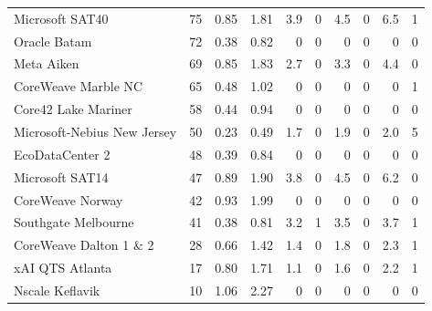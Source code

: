{\begin{longtable}{@{}lrrrrrrrrr@{}}
Microsoft SAT40 & 75 & 0.85 & 1.81 & 3.9 & 0 & 4.5 & 0 & 6.5 & 1 \\
Oracle Batam & 72 & 0.38 & 0.82 & 0 & 0 & 0 & 0 & 0 & 0 \\
Meta Aiken & 69 & 0.85 & 1.83 & 2.7 & 0 & 3.3 & 0 & 4.4 & 0 \\
CoreWeave Marble NC & 65 & 0.48 & 1.02 & 0 & 0 & 0 & 0 & 0 & 1 \\
Core42 Lake Mariner & 58 & 0.44 & 0.94 & 0 & 0 & 0 & 0 & 0 & 0 \\
Microsoft-Nebius New Jersey & 50 & 0.23 & 0.49 & 1.7 & 0 & 1.9 & 0 & 2.0 & 5 \\
EcoDataCenter 2 & 48 & 0.39 & 0.84 & 0 & 0 & 0 & 0 & 0 & 0 \\
Microsoft SAT14 & 47 & 0.89 & 1.90 & 3.8 & 0 & 4.5 & 0 & 6.2 & 0 \\
CoreWeave Norway & 42 & 0.93 & 1.99 & 0 & 0 & 0 & 0 & 0 & 0 \\
Southgate Melbourne & 41 & 0.38 & 0.81 & 3.2 & 1 & 3.5 & 0 & 3.7 & 1 \\
CoreWeave Dalton 1 \& 2 & 28 & 0.66 & 1.42 & 1.4 & 0 & 1.8 & 0 & 2.3 & 1 \\
xAI QTS Atlanta & 17 & 0.80 & 1.71 & 1.1 & 0 & 1.6 & 0 & 2.2 & 1 \\
Nscale Keflavik & 10 & 1.06 & 2.27 & 0 & 0 & 0 & 0 & 0 & 0 \\
\end{longtable}}
